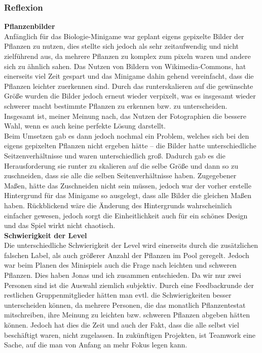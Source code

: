 \subsubsection{Reflexion}
\textbf{Pflanzenbilder} \\
Anfänglich für das Biologie-Minigame war geplant eigens gepixelte Bilder der Pflanzen zu nutzen, dies stellte sich jedoch als sehr zeitaufwendig und nicht zielführend aus, da mehrere Pflanzen zu komplex zum pixeln waren und andere sich zu ähnlich sahen.
Das Nutzen von Bildern von Wikimedia-Commons, hat einerseits viel Zeit gespart und das Minigame dahin gehend vereinfacht, dass die Pflanzen leichter zuerkennen sind. Durch das runterskalieren auf die gewünschte Größe wurden die Bilder jedoch erneut wieder verpixelt, was es insgesamt wieder schwerer macht bestimmte Pflanzen zu erkennen bzw. zu unterscheiden.
Insgesamt ist, meiner Meinung nach, das Nutzen der Fotographien die bessere Wahl, wenn es auch keine perfekte Lösung darstellt. \\
Beim Umsetzen gab es dann jedoch nochmal ein Problem, welches sich bei den eigens gepixelten Pflanzen nicht ergeben hätte – die Bilder hatte unterschiedliche Seitzenverhältnisse und waren unterschiedlich groß. Dadurch gab es die Herausforderung sie runter zu skalieren auf die selbe Größe und dann so zu zuschneiden, dass sie alle die selben Seitenverhältnisse haben.
Zugegebener Maßen, hätte das Zuschneiden nicht sein müssen, jedoch war der vorher erstelle Hintergrund für das Minigame so ausgelegt, dass alle Bilder die gleichen Maßen haben. Rückblickend wäre die Änderung des Hintergrunds wahrscheinlich einfacher gewesen, jedoch sorgt die Einheitlichkeit auch für ein schönes Design und das Spiel wirkt nicht chaotisch. \\
\textbf{Schwierigkeit der Level} \\
Die unterschiedliche Schwierigkeit der Level wird einerseits durch die zusätzlichen falschen Label, als auch größerer Anzahl der Pflanzen im Pool geregelt. Jedoch war beim Planen des Minispiels auch die Frage nach \glqq{}leichten\grqq{} und \glqq{}schweren\grqq{} Pflanzen. Dies haben Jonas und ich zusammen entschieden. Da wir nur zwei Personen sind ist die Auswahl ziemlich subjektiv.
Durch eine Feedbackrunde der restlichen Gruppenmitglieder hätten man evtl. die Schwierigkeiten besser unterscheiden können, da mehrere Personen, die das monatlich Pflanzentestat mitschreiben, ihre Meinung zu leichten bzw. schweren Pflanzen abgeben hätten können.
Jedoch hat dies die Zeit und auch der Fakt, dass die alle selbst viel beschäftigt waren, nicht zugelassen. In zukünftigen Projekten, ist Teamwork eine Sache, auf die man von Anfang an mehr Fokus legen kann. \\
